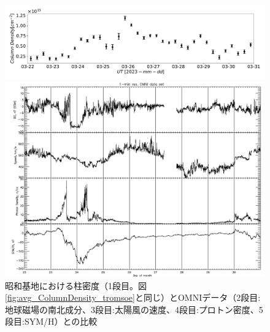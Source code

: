 \begin{figure}[htbp]
    \centering
    \begin{minipage}{\linewidth}
        \centering
        \includegraphics[width=\linewidth]{master_thesis_contents/master_thesis_fig/column_density_spectr6_syowa.pdf}
    \end{minipage}
    \begin{minipage}{0.96\linewidth}
        \centering
        \includegraphics[width=\linewidth]{master_thesis_contents/master_thesis_fig/omni_syowa.pdf}
    \end{minipage}
    \caption{昭和基地における柱密度（1段目。図\ref{fig:avg_ColumnDensity_tromsoe}と同じ）とOMNIデータ（2段目:地球磁場の南北成分、3段目:太陽風の速度、4段目:プロトン密度、5段目:SYM/H）との比較}
    \label{fig:omni_mmcd_syowa}
\end{figure}
